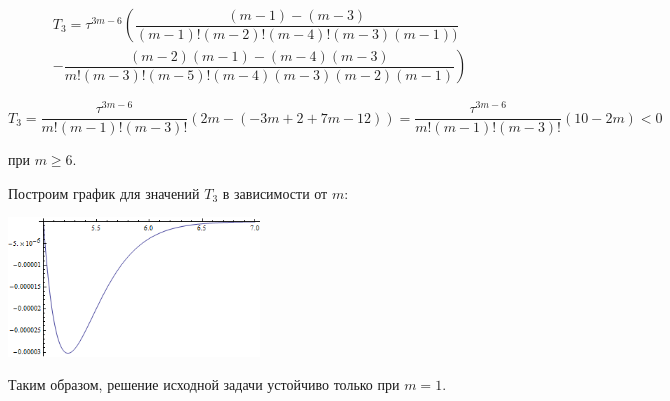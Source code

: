 \begin{multline*}
T_3 = \tau^{3m-6} \left( \dfrac{(m-1) - (m-3)}{(m-1)!(m-2)!(m-4)!(m-3)(m-1))} \right. \\ \left. - \dfrac{(m-2)(m-1) - (m-4)(m-3)}{m!(m-3)!(m-5)!(m-4)(m-3)(m-2)(m-1)} \right)
\end{multline*}

\begin{equation*}
T_3 = \dfrac{\tau^{3m-6}}{m!(m-1)!(m-3)!} (2m - (-3m + 2 + 7m - 12)) = \dfrac{\tau^{3m-6}}{m!(m-1)!(m-3)!} (10-2m) < 0
\end{equation*}

при $m \geq 6$.

Построим график для значений $T_3$ в зависимости от $m$:

\begin{center}
\includegraphics[width=0.5\textwidth]{coefCheck.png}
\end{center}

Таким образом, решение исходной задачи устойчиво только при $m=1$.
